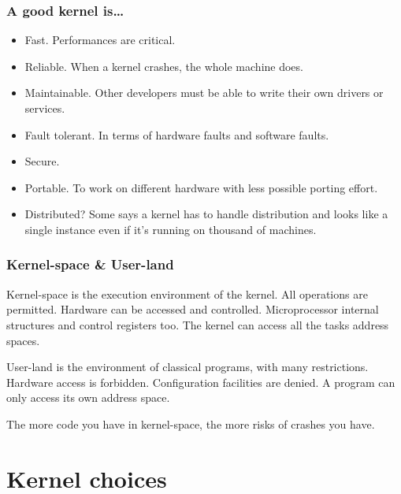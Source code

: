 
\begin{frame}
  \frametitle{A good kernel is\ldots}

  \begin{itemize}
  \item
    Fast. Performances are critical.
  \item
    Reliable. When a kernel crashes, the whole machine does.
  \item
    Maintainable. Other developers must be able to write their own drivers or services.
  \item
    Fault tolerant. In terms of hardware faults and software faults.
  \item
    Secure.
  \item
    Portable. To work on different hardware with less possible porting effort.
  \item
    Distributed? Some says a kernel has to handle distribution and looks like a single instance even if it's running on thousand of machines.
  \end{itemize}

\end{frame}


\begin{frame}
  \frametitle{Kernel-space \& User-land}

  Kernel-space is the execution environment of the kernel. All operations are permitted. Hardware can be accessed and controlled. Microprocessor internal structures and control registers too. The kernel can access all the tasks address spaces.

  \-

  User-land is the environment of classical programs, with many restrictions. Hardware access is forbidden. Configuration facilities are denied. A program can only access its own address space.

  \-

  The more code you have in kernel-space, the more risks of crashes you
  have.

\end{frame}

%
%

\section{Kernel choices}

